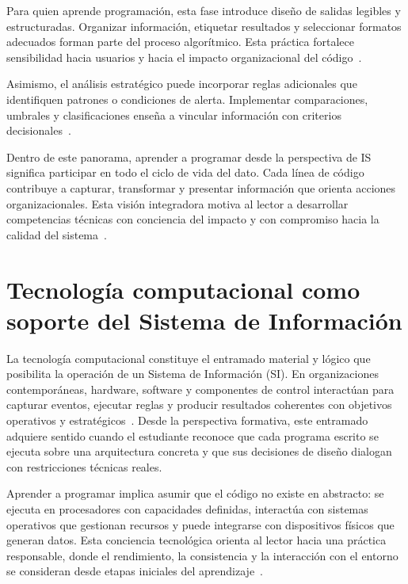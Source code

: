 \documentclass[12pt,twoside]{book}
\begin{document}
						Para quien aprende programación, esta fase introduce diseño de salidas legibles y estructuradas. Organizar información, etiquetar resultados y seleccionar formatos adecuados forman parte del proceso algorítmico. Esta práctica fortalece sensibilidad hacia usuarios y hacia el impacto organizacional del código~\cite{Dix2004HCI,Kendall2014Systems,Gaddis2022Starting}.
						
						Asimismo, el análisis estratégico puede incorporar reglas adicionales que identifiquen patrones o condiciones de alerta. Implementar comparaciones, umbrales y clasificaciones enseña a vincular información con criterios decisionales~\cite{Wirth1976Algorithms,Hanly2015Problem,Laudon2020Management}.
						
						Dentro de este panorama, aprender a programar desde la perspectiva de IS significa participar en todo el ciclo de vida del dato. Cada línea de código contribuye a capturar, transformar y presentar información que orienta acciones organizacionales. Esta visión integradora motiva al lector a desarrollar competencias técnicas con conciencia del impacto y con compromiso hacia la calidad del sistema~\cite{Leidig2021Competency,Leidig2020Updating,Ghezzi2003Fundamentals}.
							
			\section{Tecnología computacional como soporte del Sistema de Información}
				\noindent
				La tecnología computacional constituye el entramado material y lógico que posibilita la operación de un Sistema de Información (SI). En organizaciones contemporáneas, hardware, software y componentes de control interactúan para capturar eventos, ejecutar reglas y producir resultados coherentes con objetivos operativos y estratégicos~\cite{Laudon2020Management,Kendall2014Systems,Tegarden2025Systems}. Desde la perspectiva formativa, este entramado adquiere sentido cuando el estudiante reconoce que cada programa escrito se ejecuta sobre una arquitectura concreta y que sus decisiones de diseño dialogan con restricciones técnicas reales.
				
				Aprender a programar implica asumir que el código no existe en abstracto: se ejecuta en procesadores con capacidades definidas, interactúa con sistemas operativos que gestionan recursos y puede integrarse con dispositivos físicos que generan datos. Esta conciencia tecnológica orienta al lector hacia una práctica responsable, donde el rendimiento, la consistencia y la interacción con el entorno se consideran desde etapas iniciales del aprendizaje~\cite{Silberschatz2018Operating,Gaddis2022Starting,Hanly2015Problem}.
				
\end{document}
